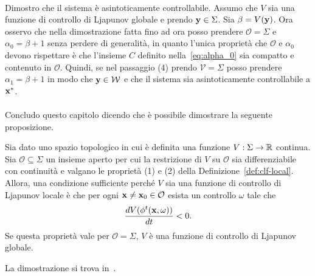 \begin{steps}
    \hfill\qedsymbol\paragraph{}

    \item Dimostro che il sistema è asintoticamente controllabile.
    Assumo che $V$ sia una funzione di controllo di Ljapunov globale
    e prendo $\mathbf{y} \in \Sigma$.
    Sia $\beta = V(\mathbf{y})$.
    Ora osservo che nella dimostrazione fatta fino ad ora posso prendere
    $\mathcal O = \Sigma$ e $\alpha_0 = \beta + 1$
    senza perdere di generalità, in quanto l'unica proprietà che $\mathcal O$
    e $\alpha_0$ devono rispettare è che l'insieme $C$
    definito nella~\eqref{eq:alpha_0}
    sia compatto e contenuto in $\mathcal O$.
    Quindi, se nel passaggio (4) prendo $\mathcal V = \Sigma$
    posso prendere $\alpha_1 = \beta + 1$ in modo che
    $\mathbf{y} \in \mathcal{W}$ e che il sistema sia
    asintoticamente controllabile a $\mathbf{x}^*$.

    \hfill\qedsymbol\paragraph{}

\end{steps}

Concludo questo capitolo dicendo che è possibile
dimostrare la seguente proposizione.
\begin{prop}
    Sia dato uno spazio topologico in cui è 
    definita una funzione $V : \Sigma \to \mathbb{R}$ continua.
    Sia $\mathcal O \subseteq \Sigma$
    un insieme aperto per cui la restrizione di
    $V$ su $\mathcal O$ sia differenziabile con 
    continuità e valgano le proprietà (1) e (2) 
    della Definizione~\ref{def:clf-local}.
    Allora, una condizione sufficiente perché $V$
    sia una funzione di controllo di Ljapunov locale è che per ogni $\mathbf{x} \neq \mathbf{x}_0 \in \mathcal O$
    esista un controllo $\omega$ tale che
    \begin{equation*}
        \frac{dV(\phi^t(\mathbf{x}, \omega))}{dt} < 0.
    \end{equation*}
    Se questa proprietà vale per $\mathcal O = \Sigma$, $V$ è una funzione di controllo di Ljapunov globale. 
    \label{prop:condizione-sufficiente-ljapunov}
\end{prop}
La dimostrazione si trova in~\cite{sontagMath}.
